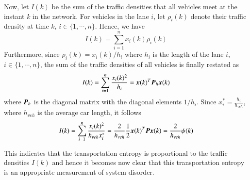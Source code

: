 \documentclass[preprint,authoryear,12pt]{elsarticle}
\renewcommand{\vec}[1]{\mbox{\boldmath$#1$}}
\newcommand{\mat}[1]{\mbox{\boldmath$#1$}}
\begin{document}
Now, let $I(k)$ be the sum of the traffic densities that all vehicles meet at the instant $k$ in the network. For vehicles in the lane $i$, let $\rho_i(k)$ denote their traffic density at time $k$, $i\in \{1,\cdots,n\}$. Hence, we have
$$I(k)=\sum_{i=1}^{n} x_i(k)\rho_i(k)$$
Furthermore, since $\rho_i(k)=x_i(k)/h_i$ where $h_i$ is the length of the lane $i$, $i\in \{1,\cdots,n\}$, the sum of the traffic densities of all vehicles is finally restated as
\begin{equation}
\label{equ:quality_service}
I(k)=\sum_{i=1}^{n}
\frac{x_i(k)^2}{h_i}=\vec{x}(k)^T\mat{P}_h\vec{x}(k)
\end{equation}
where $\mat{P}_h$ is the diagonal matrix with the diagonal elements $1/h_i$. Since $x_i^*=\frac{h_i}{h_{veh}}$, where $h_{veh}$ is the average car length, it follows
\begin{equation}
I(k) = \sum_{i=1}^{n}\frac{x_i(k)^2}{h_{veh} x_i^*}
= \frac{2}{h_{veh}} \frac{1}{2}\vec{x}(k)^T\mat{P}\vec{x}(k)
= \frac{2}{h_{veh}} \psi(k)
\end{equation}

This indicates that the transportation entropy is proportional to the traffic densities $I(k)$ and hence it becomes now clear that this  transportation entropy  is an appropriate measurement of system disorder.


% 
\end{document}
